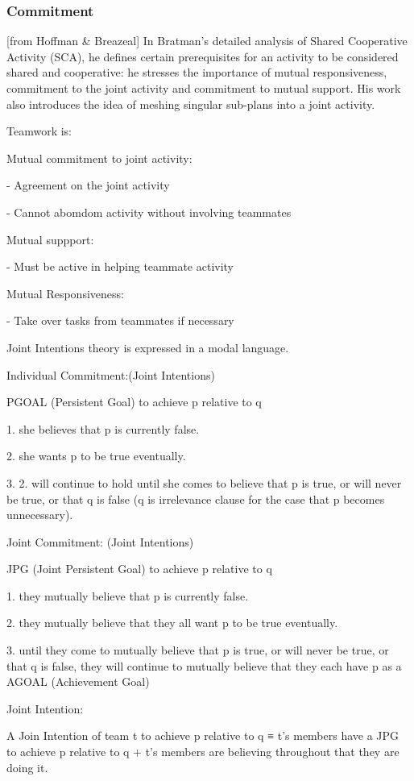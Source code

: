 \documentclass[11pt]{article}
\begin{document}
\subsubsection{Commitment}

[from Hoffman \& Breazeal] In Bratman’s detailed analysis of Shared Cooperative
Activity (SCA), he defines certain prerequisites for an activity to be
considered shared and cooperative: he stresses the importance of mutual
responsiveness, commitment to the joint activity and commitment to mutual
support. His work also introduces the idea of meshing singular sub-plans into a
joint activity.

Teamwork is:

Mutual commitment to joint activity:

- Agreement on the joint activity

- Cannot abomdom activity without involving teammates

Mutual suppport:

- Must be active in helping teammate activity

Mutual Responsiveness:

- Take over tasks from teammates if necessary

Joint Intentions theory is expressed in a modal language.

Individual Commitment:(Joint Intentions)

PGOAL (Persistent Goal) to achieve p relative to q

1. she believes that p is currently false.

2. she wants p to be true eventually.

3. 2. will continue to hold until she comes to believe that p is true, or will
never be true, or that q is false (q is irrelevance clause for the case that p
becomes unnecessary).

Joint Commitment: (Joint Intentions)

JPG (Joint Persistent Goal) to achieve p relative to q

1. they mutually believe that p is currently false.

2. they mutually believe that they all want p to be true eventually.

3. until they come to mutually believe that p is true, or will never be true, or
that q is false, they will continue to mutually believe that they each have p as
a AGOAL (Achievement Goal)

Joint Intention:

A Join Intention of team t to achieve p relative to q
≡
t’s members have a JPG to achieve p relative to q 
+
t’s members are believing throughout that they are doing it.
\end{document}
